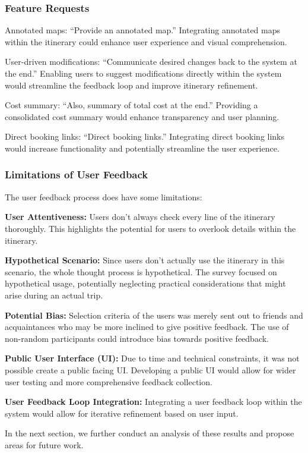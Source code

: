 \documentclass[12pt,a4paper]{report}
\begin{document}
\subsubsection{Feature Requests}
\begin{description}
\item{Annotated maps: “Provide an annotated map.” Integrating annotated maps within the itinerary could enhance user experience and visual comprehension.}
\item{User-driven modifications: “Communicate desired changes back to the system at the end.” Enabling users to suggest modifications directly within the system would streamline the feedback loop and improve itinerary refinement.}
\item{Cost summary: “Also, summary of total cost at the end.” Providing a consolidated cost summary would enhance transparency and user planning.}
\item{Direct booking links: “Direct booking links.” Integrating direct booking links would increase functionality and potentially streamline the user experience.}
\end{description}

\subsubsection{Limitations of User Feedback}

The user feedback process does have some limitations:

\begin{description}
\item{\textbf{User Attentiveness:} Users don’t always check every line of the itinerary thoroughly. This highlights the potential for users to overlook details within the itinerary.}
\item{\textbf{Hypothetical Scenario:} Since users don’t actually use the itinerary in this scenario, the whole thought process is hypothetical. The survey focused on hypothetical usage, potentially neglecting practical considerations that might arise during an actual trip.}
\item{\textbf{Potential Bias:} Selection criteria of the users was merely sent out to friends and acquaintances who may be more inclined to give positive feedback. The use of non-random participants could introduce bias towards positive feedback.}
\item{\textbf{Public User Interface (UI):} Due to time and technical constraints, it was not possible create a public facing UI. Developing a public UI would allow for wider user testing and more comprehensive feedback collection.}
\item{\textbf{User Feedback Loop Integration:} Integrating a user feedback loop within the system would allow for iterative refinement based on user input.}
\end{description}
In the next section, we further conduct an analysis of these results and propose areas for future work.
\end{document}

